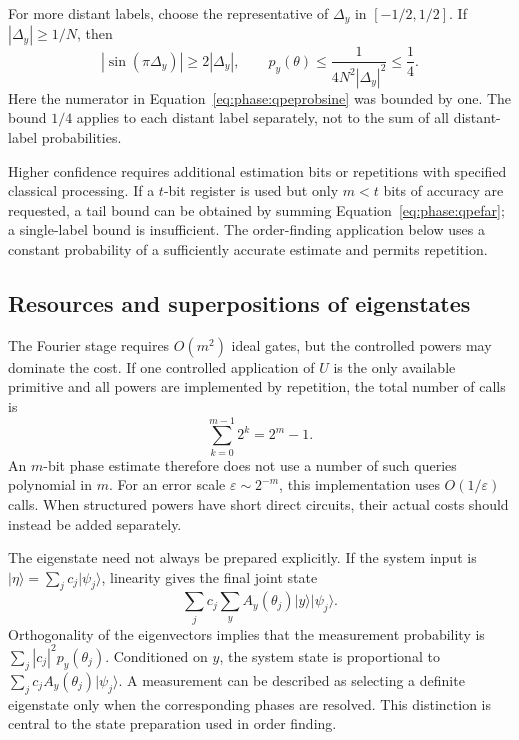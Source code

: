 \documentclass[11pt,oneside,openany]{book}
\providecommand{\ket}{}
\renewcommand{\ket}[1]{\lvert #1\rangle}
\theoremstyle{definition}
\begin{document}
For more distant labels, choose the representative of $\Delta_y$ in $[-1/2,1/2]$. If $|\Delta_y|\ge1/N$, then
\begin{equation}
 |\sin(\pi\Delta_y)|\ge2|\Delta_y|,
 \qquad
 p_y(\theta)\le\frac1{4N^2|\Delta_y|^2}\le\frac14.
 \label{eq:phase:qpefar}
\end{equation}
Here the numerator in Equation~\eqref{eq:phase:qpeprobsine} was bounded by one. The bound $1/4$ applies to each distant label separately, not to the sum of all distant-label probabilities.

Higher confidence requires additional estimation bits or repetitions with specified classical processing. If a $t$-bit register is used but only $m<t$ bits of accuracy are requested, a tail bound can be obtained by summing Equation~\eqref{eq:phase:qpefar}; a single-label bound is insufficient. The order-finding application below uses a constant probability of a sufficiently accurate estimate and permits repetition.

\subsection{Resources and superpositions of eigenstates}

The Fourier stage requires $O(m^2)$ ideal gates, but the controlled powers may dominate the cost. If one controlled application of $U$ is the only available primitive and all powers are implemented by repetition, the total number of calls is
\begin{equation}
 \sum_{k=0}^{m-1}2^k=2^m-1.
 \label{eq:phase:qpequerycost}
\end{equation}
An $m$-bit phase estimate therefore does not use a number of such queries polynomial in $m$. For an error scale $\varepsilon\sim2^{-m}$, this implementation uses $O(1/\varepsilon)$ calls. When structured powers have short direct circuits, their actual costs should instead be added separately.

The eigenstate need not always be prepared explicitly. If the system input is $\ket\eta=\sum_jc_j\ket{\psi_j}$, linearity gives the final joint state
\begin{equation}
 \sum_j c_j\sum_y A_y(\theta_j)\ket y\ket{\psi_j}.
 \label{eq:phase:qpesuperposition}
\end{equation}
Orthogonality of the eigenvectors implies that the measurement probability is $\sum_j|c_j|^2p_y(\theta_j)$. Conditioned on $y$, the system state is proportional to $\sum_jc_jA_y(\theta_j)\ket{\psi_j}$. A measurement can be described as selecting a definite eigenstate only when the corresponding phases are resolved. This distinction is central to the state preparation used in order finding.
\end{document}
